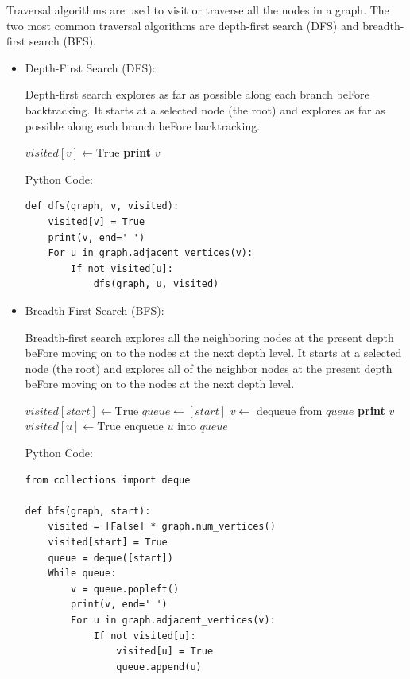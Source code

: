 \documentclass[12pt]{book} %
\begin{document}
Traversal algorithms are used to visit or traverse all the nodes in a graph. The two most common traversal algorithms are depth-first search (DFS) and breadth-first search (BFS).
\begin{itemize}
    \item Depth-First Search (DFS):

Depth-first search explores as far as possible along each branch beFore backtracking. It starts at a selected node (the root) and explores as far as possible along each branch beFore backtracking.
\FloatBarrier
\begin{algorithm}
\caption{Depth-first Search (DFS)}
\begin{algorithmic}[1]
    \State $visited[v] \gets \text{True}$
    \State \textbf{print} $v$
            \State {}
        \EndIf
    \EndFor
\EndFunction
\end{algorithmic}
\end{algorithm}
\FloatBarrier
Python Code:
\FloatBarrier

\begin{verbatim}
def dfs(graph, v, visited):
    visited[v] = True
    print(v, end=' ')
    For u in graph.adjacent_vertices(v):
        If not visited[u]:
            dfs(graph, u, visited)
\end{verbatim}
\FloatBarrier

\item Breadth-First Search (BFS):

Breadth-first search explores all the neighboring nodes at the present depth beFore moving on to the nodes at the next depth level. It starts at a selected node (the root) and explores all of the neighbor nodes at the present depth beFore moving on to the nodes at the next depth level.
\FloatBarrier %
\begin{algorithm}
\caption{Breadth-first Search (BFS)}
\begin{algorithmic}[1]
    \State $visited[start] \gets \text{True}$
    \State $queue \gets [start]$
        \State $v \gets$ dequeue from $queue$
        \State \textbf{print} $v$
                \State $visited[u] \gets \text{True}$
                \State enqueue $u$ into $queue$
            \EndIf
        \EndFor
    \EndWhile
\EndFunction
\end{algorithmic}
\end{algorithm}
\FloatBarrier
Python Code:
\FloatBarrier
\begin{verbatim}
from collections import deque

def bfs(graph, start):
    visited = [False] * graph.num_vertices()
    visited[start] = True
    queue = deque([start])
    While queue:
        v = queue.popleft()
        print(v, end=' ')
        For u in graph.adjacent_vertices(v):
            If not visited[u]:
                visited[u] = True
                queue.append(u)
\end{verbatim}
\end{itemize}
\end{document}
